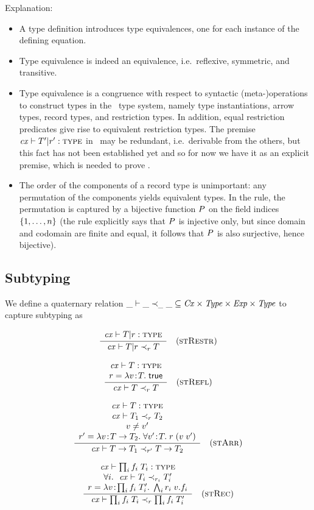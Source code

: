 Explanation:
\begin{itemize}
\item
A type definition introduces type equivalences, one for each instance of the
defining equation.
\item
Type equivalence is indeed an equivalence, i.e.\ reflexive, symmetric, and
transitive.
\item
Type equivalence is a congruence with respect to syntactic (meta-)operations
to construct types in the \MS\ type system, namely type instantiations, arrow
types, record types, and restriction types. In addition, equal restriction
predicates give rise to equivalent restriction types. The premise
$\mathit{cx}\vdash T'|r':\textsc{type}$ in \Rterestr\ may be redundant, i.e.\
derivable from the others, but this fact has not been established yet and so
for now we have it as an explicit premise, which is needed to prove
\thmref{thm-equiv-types-wf}.
\item
The order of the components of a record type is unimportant: any permutation
of the components yields equivalent types. In the rule, the permutation is
captured by a bijective function $P$ on the field indices $\{1,\ldots,n\}$
(the rule explicitly says that $P$ is injective only, but since domain and
codomain are finite and equal, it follows that $P$ is also surjective,
hence bijective).
\end{itemize}

\subsection{Subtyping}

We define a quaternary relation $\_\vdash\_\prec_{\_}\_\subseteq\mathit{Cx}\times\mathit{Type}\times\mathit{Exp}\times\mathit{Type}$ to
capture subtyping as

\[
\frac{\begin{array}{c}\mathit{cx}\vdash T|r:\textsc{type}\end{array}}{\mathit{cx}\vdash T|r\prec_{r}T}\quad\mbox{(\textsc{stRestr})}
\]

\[
\frac{\begin{array}{c}\mathit{cx}\vdash T:\textsc{type}\\r=\lambda v\!:\!T.\;\mathsf{true}\end{array}}{\mathit{cx}\vdash T\prec_{r}T}\quad\mbox{(\textsc{stRefl})}
\]

\[
\frac{\begin{array}{c}\mathit{cx}\vdash T:\textsc{type}\\\mathit{cx}\vdash T_1\prec_{r}T_2\\v\neq v'\\r'=\lambda v\!:\!T\to T_2.\;\forall v'\!:\!T.\;r\;(v\;v')\end{array}}{\mathit{cx}\vdash T\to T_1\prec_{r'}T\to T_2}\quad\mbox{(\textsc{stArr})}
\]

\[
\frac{\begin{array}{c}\mathit{cx}\vdash\prod_{i}f_i\;T_i:\textsc{type}\\\forall i.\ \ \mathit{cx}\vdash T_i\prec_{r_i}T_i'\\r=\lambda v\!:\!\prod_{i}f_i\;T_i'.\;\bigwedge_{i}r_i\;v.f_i\end{array}}{\mathit{cx}\vdash\prod_{i}f_i\;T_i\prec_{r}\prod_{i}f_i\;T_i'}\quad\mbox{(\textsc{stRec})}
\]

